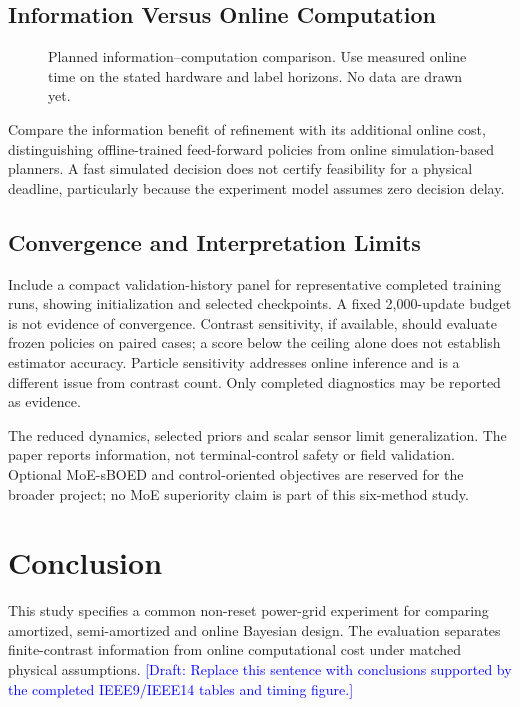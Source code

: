 \documentclass[conference]{IEEEtran}
\newcommand{\draftnote}[1]{\textcolor{blue}{[Draft: #1]}}
\begin{document}
\subsection{Information Versus Online Computation}
\begin{figure}[t]
\centering
{}
\caption{Planned information--computation comparison. Use measured
online time on the stated hardware and label horizons. No data are drawn yet.}
\label{fig:tradeoff}
\end{figure}
Compare the information benefit of refinement with its additional online
cost, distinguishing offline-trained feed-forward policies from online
simulation-based planners. A fast simulated decision does not certify
feasibility for a physical deadline, particularly because the experiment
model assumes zero decision delay.

\subsection{Convergence and Interpretation Limits}
Include a compact validation-history panel for representative completed
training runs, showing initialization and selected checkpoints. A fixed
2,000-update budget is not evidence of convergence. Contrast sensitivity,
if available, should evaluate frozen policies on paired cases; a score below
the ceiling alone does not establish estimator accuracy. Particle sensitivity
addresses online inference and is a different issue from contrast count.
Only completed diagnostics may be reported as evidence.

The reduced dynamics, selected priors and scalar sensor limit generalization.
The paper reports information, not terminal-control safety or field validation.
Optional MoE-sBOED and control-oriented objectives are reserved for the
broader project; no MoE superiority claim is part of this six-method study.

\section{Conclusion}
This study specifies a common non-reset power-grid experiment for comparing
amortized, semi-amortized and online Bayesian design. The evaluation separates
finite-contrast information from online computational cost under matched
physical assumptions. \draftnote{Replace this sentence with conclusions
supported by the completed IEEE9/IEEE14 tables and timing figure.}


\end{document}
